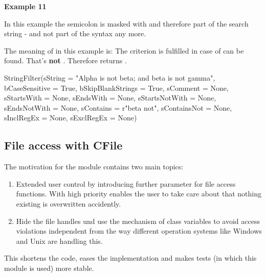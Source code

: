 \textbf{Example 11}

In this example the semicolon is masked with  and therefore part of the search string  - and
not part of the syntax any more.

The meaning of  in this example is: The criterion is fulfilled in case of  can be found.
That's \textbf{not} . Therefore  returns .

\begin{pythoncode}
StringFilter(sString           = "Alpha is not beta; and beta is not gamma",
             bCaseSensitive    = True,
             bSkipBlankStrings = True,
             sComment          = None,
             sStartsWith       = None,
             sEndsWith         = None,
             sStartsNotWith    = None,
             sEndsNotWith      = None,
             sContains         = r"beta\; not",
             sContainsNot      = None,
             sInclRegEx        = None,
             sExclRegEx        = None)
\end{pythoncode}

\newpage

\subsection{File access with CFile}

The motivation for the  module contains two main topics:

\begin{enumerate}
   \item Extended user control by introducing further parameter for file access functions. With high priority  enables the user
         to take care about that nothing existing is overwritten accidently.
   \item Hide the file handles und use the mechanism of class variables to avoid access violations independent from
         the way different operation systems like Windows and Unix are handling this.
\end{enumerate}

This shortens the code, eases the implementation and makes tests (in which this module is used) more stable.

\vspace{1ex}

